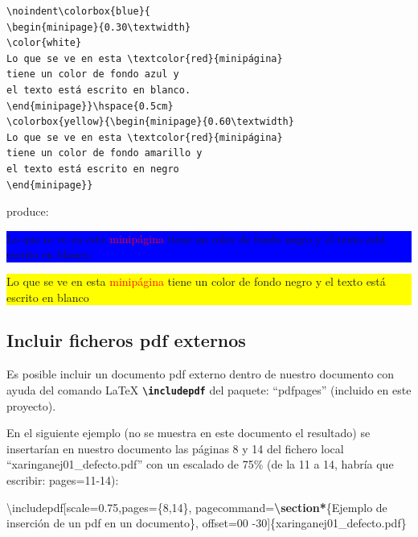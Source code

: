 \documentclass[12pt,a4paper,oneside,]{book}
\newenvironment{Shaded}{\begin{snugshade}}{\end{snugshade}}
\newcommand{\FunctionTok}[1]{\textcolor[rgb]{0.00,0.00,0.00}{#1}}
\newcommand{\KeywordTok}[1]{\textcolor[rgb]{0.13,0.29,0.53}{\textbf{#1}}}
\newcommand{\NormalTok}[1]{#1}
\numberwithin{dummy}{section}
\theoremstyle{ocrenumbox}
\theoremstyle{blacknumex}
\theoremstyle{blacknumbox}
\theoremstyle{ocrenum}
\theoremstyle{ocrenum}
\begin{document}
\begin{verbatim}
\noindent\colorbox{blue}{
\begin{minipage}{0.30\textwidth}
\color{white}
Lo que se ve en esta \textcolor{red}{minipágina} 
tiene un color de fondo azul y
el texto está escrito en blanco. 
\end{minipage}}\hspace{0.5cm} 
\colorbox{yellow}{\begin{minipage}{0.60\textwidth} 
Lo que se ve en esta \textcolor{red}{minipágina} 
tiene un color de fondo amarillo y
el texto está escrito en negro
\end{minipage}}
\end{verbatim}

produce:

\noindent

\colorbox{blue}{
\begin{minipage}{0.30\textwidth}
\color{white}
Lo que se ve en esta \textcolor{red}{minipágina} 
tiene un color de fondo negro y
el texto está escrito en blanco. 
\end{minipage}}\hspace{0.5cm} 
\colorbox{yellow}{\begin{minipage}{0.60\textwidth} 
Lo que se ve en esta \textcolor{red}{minipágina} 
tiene un color de fondo negro y
el texto está escrito en blanco
\end{minipage}}

\texttt{}

\hypertarget{incluir-ficheros-pdf-externos}{%
\subsection{Incluir ficheros pdf
externos}\label{incluir-ficheros-pdf-externos}}

Es posible incluir un documento pdf externo dentro de nuestro documento
con ayuda del comando LaTeX \textbf{\texttt{\textbackslash{}includepdf}}
del paquete: ``pdfpages'' (incluido en este proyecto).

En el siguiente ejemplo (no se muestra en este documento el resultado)
se insertarían en nuestro documento las páginas 8 y 14 del fichero local
``xaringanej01\_defecto.pdf'' con un escalado de 75\% (de la 11 a 14,
habría que escribir: pages=11-14):

\begin{Shaded}
\begin{Highlighting}[]
\FunctionTok{\textbackslash{}includepdf}\NormalTok{[scale=0.75,pages=\{8,14\}, }
\NormalTok{  pagecommand=}\KeywordTok{\textbackslash{}section*}\NormalTok{\{Ejemplo de inserción de un pdf en un documento\}, }
\NormalTok{  offset=00 {-}30]\{xaringanej01\_defecto.pdf\}}
\end{Highlighting}
\end{Shaded}
\end{document}
